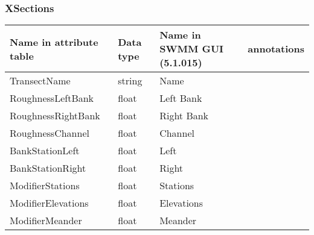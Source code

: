 \documentclass[10pt,a4paper,oneside]{scrbook}
\begin{document}
\subsubsection{XSections}
\begin{tabular}{p{4cm}|p{1.3cm}|P{3cm}|P{5.7cm}}
\hline 
\textbf{Name in attribute table} & \textbf{Data type} & \textbf{Name in SWMM GUI (5.1.015)} & \textbf{annotations}\\ 
\hline 
TransectName & string & Name & \\
RoughnessLeftBank & float & Left Bank & \\ 
RoughnessRightBank & float & Right Bank & \\ 
RoughnessChannel & float & Channel & \\ 
BankStationLeft & float & Left& \\  
BankStationRight& float & Right & \\ 
ModifierStations & float & Stations & \\ 
ModifierElevations& float & Elevations & \\ 
ModifierMeander& float & Meander & \\ 
\hline
\end{tabular}
								
\end{document}
